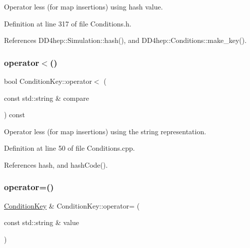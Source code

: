 Operator less (for map insertions) using hash value. 



Definition at line 317 of file Conditions.\+h.



References D\+D4hep\+::\+Simulation\+::hash(), and D\+D4hep\+::\+Conditions\+::make\+\_\+key().

\hypertarget{class_d_d4hep_1_1_conditions_1_1_condition_key_a609a3bb628fb06468aacf17c0390c29d}{}\label{class_d_d4hep_1_1_conditions_1_1_condition_key_a609a3bb628fb06468aacf17c0390c29d} 
\subsubsection{\texorpdfstring{operator$<$()}{operator<()}\hspace{0.1cm}{\footnotesize\ttfamily [3/3]}}
{\footnotesize\ttfamily bool Condition\+Key\+::operator$<$ (\begin{DoxyParamCaption}\item[{const std\+::string \&}]{compare }\end{DoxyParamCaption}) const}



Operator less (for map insertions) using the string representation. 



Definition at line 50 of file Conditions.\+cpp.



References hash, and hash\+Code().

\hypertarget{class_d_d4hep_1_1_conditions_1_1_condition_key_a161b7bb32fa7d86dcd490e964d17f2df}{}\label{class_d_d4hep_1_1_conditions_1_1_condition_key_a161b7bb32fa7d86dcd490e964d17f2df} 
\subsubsection{\texorpdfstring{operator=()}{operator=()}\hspace{0.1cm}{\footnotesize\ttfamily [1/2]}}
{\footnotesize\ttfamily \hyperlink{class_d_d4hep_1_1_conditions_1_1_condition_key}{Condition\+Key} \& Condition\+Key\+::operator= (\begin{DoxyParamCaption}\item[{const std\+::string \&}]{value }\end{DoxyParamCaption})}



